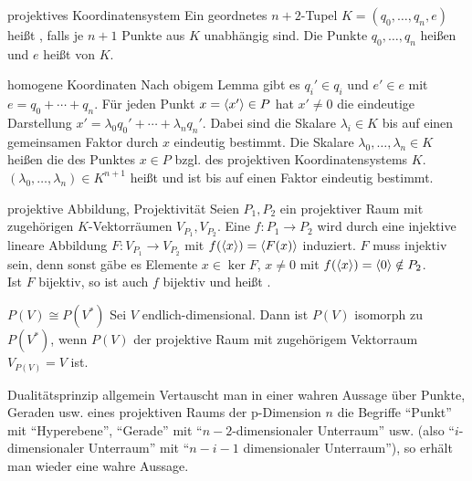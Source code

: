 \begin{Def}{projektives Koordinatensystem}
    Ein geordnetes $n+2$-Tupel $K = (q_0, \ldots, q_n, e)$ heißt
    ,
    falls je $n + 1$ Punkte aus $K$ unabhängig sind.
    Die Punkte $q_0, \ldots, q_n$ heißen  und $e$ heißt
     von $K$.
\end{Def}

\begin{Def}{homogene Koordinaten}
    Nach obigem Lemma gibt es $q_i' \in q_i$ und $e' \in e$
    mit $e = q_0 + \cdots + q_n$.
    Für jeden Punkt $x = \langle x' \rangle \in P$ hat $x' \not= 0$ die eindeutige
    Darstellung $x' = \lambda_0 q_0' + \cdots + \lambda_n q_n'$.
    Dabei sind die Skalare $\lambda_i \in K$ bis auf einen gemeinsamen Faktor
    durch $x$ eindeutig bestimmt.
    Die Skalare $\lambda_0, \ldots, \lambda_n \in K$ heißen die
     des Punktes $x \in P$ bzgl. des projektiven
    Koordinatensystems $K$.
    $(\lambda_0, \ldots, \lambda_n) \in K^{n+1}$ heißt
     und ist bis auf einen Faktor
    eindeutig bestimmt.
\end{Def}

\begin{Def}{projektive Abbildung, Projektivität}
    Seien $P_1, P_2$ ein projektiver Raum mit zugehörigen $K$-Vektorräumen
    $V_{P_1}, V_{P_2}$.
    Eine  $f: P_1 \rightarrow P_2$ wird durch
    eine injektive lineare Abbildung $F: V_{P_1} \rightarrow V_{P_2}$
    mit $f(\langle x \rangle) = \langle F(x) \rangle$ induziert.
    $F$ muss injektiv sein, denn sonst gäbe es Elemente
    $x \in \ker F$, $x \not= 0$ mit
    $f(\langle x \rangle) = \langle 0 \rangle \notin P_2$. \\
    Ist $F$ bijektiv, so ist auch $f$ bijektiv und heißt
    .
\end{Def}

\begin{Satz}{$P(V) \cong P(V^\ast)$}
    Sei $V$ endlich-dimensional.
    Dann ist $P(V)$ isomorph zu $P(V^\ast)$, wenn $P(V)$ der projektive Raum
    mit zugehörigem Vektorraum $V_{P(V)} = V$ ist.
\end{Satz}

\begin{Satz}{Dualitätsprinzip allgemein}
    Vertauscht man in einer wahren Aussage über Punkte, Geraden usw.
    eines projektiven Raums der p-Dimension $n$ die Begriffe
    "`Punkt"' mit "`Hyperebene"', "`Gerade"' mit
    "`$n - 2$-dimensionaler Unterraum"' usw.
    (also "`$i$-dimensionaler Unterraum"'
    mit "`$n - i - 1$ dimensionaler Unterraum"'),
    so erhält man wieder eine wahre Aussage.
\end{Satz}

